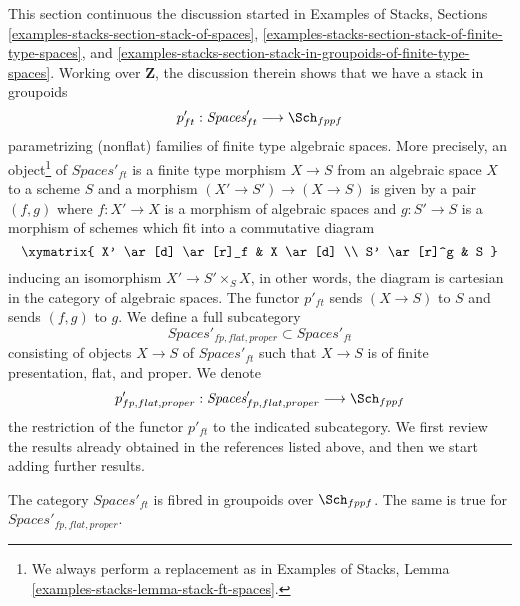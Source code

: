 \noindent
This section continuous the discussion started in
Examples of Stacks, Sections
\ref{examples-stacks-section-stack-of-spaces},
\ref{examples-stacks-section-stack-of-finite-type-spaces}, and
\ref{examples-stacks-section-stack-in-groupoids-of-finite-type-spaces}.
Working over $\mathbf{Z}$, the discussion therein shows
that we have a stack in groupoids
$$
p'_{ft} : \textit{Spaces}'_{ft} \longrightarrow \Sch_{fppf}
$$
parametrizing (nonflat) families of finite type algebraic spaces.
More precisely, an object\footnote{We always perform a replacement as in
Examples of Stacks, Lemma \ref{examples-stacks-lemma-stack-ft-spaces}.}
of $\textit{Spaces}'_{ft}$ is a finite type morphism $X \to S$
from an algebraic space $X$ to a scheme $S$ and a morphism
$(X' \to S') \to (X \to S)$ is given by a pair $(f, g)$
where $f : X' \to X$ is a morphism of algebraic spaces
and $g : S' \to S$ is a morphism of schemes
which fit into a commutative diagram
$$
\xymatrix{
X' \ar[d] \ar[r]_f & X \ar[d] \\
S' \ar[r]^g & S
}
$$
inducing an isomorphism $X' \to S' \times_S X$, in other words, the
diagram is cartesian in the category of algebraic spaces.
The functor $p'_{ft}$ sends $(X \to S)$ to $S$ and sends
$(f, g)$ to $g$. We define a full subcategory
$$
\textit{Spaces}'_{fp, flat, proper} \subset
\textit{Spaces}'_{ft}
$$
consisting of objects $X \to S$ of $\textit{Spaces}'_{ft}$
such that $X \to S$ is of finite presentation, flat, and proper.
We denote
$$
p'_{fp, flat, proper} :
\textit{Spaces}'_{fp, flat, proper}
\longrightarrow
\Sch_{fppf}
$$
the restriction of the functor $p'_{ft}$ to the indicated subcategory.
We first review the results already obtained in the references
listed above, and then we start adding further results.

\begin{lemma}
\label{lemma-spaces-fibred-in-groupoids}
The category $\textit{Spaces}'_{ft}$ is fibred in groupoids
over $\Sch_{fppf}$. The same is true for
$\textit{Spaces}'_{fp, flat, proper}$.
\end{lemma}

